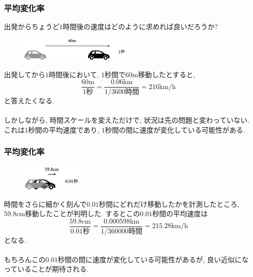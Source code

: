 \documentclass[dvipdfmx,cjk,10.2pt]{beamer}
\theoremstyle{definition}
\begin{document}
\begin{frame}
\frametitle{平均変化率}

出発からちょうど$1$時間後の速度はどのように求めれば良いだろうか? 

\vspace{-2mm}

 \begin{figure}[htbp]
 \begin{center} 
  \includegraphics[width=55mm]{60m.png}
 \end{center}
\end{figure}

\vspace{-2mm}

出発してから$1$時間後において, $1$秒間で$60$m移動したとすると, 
$$
\frac{\text{$60$m}}{\text{$1$秒}}=
\frac{\text{$0.06$km}}{\text{$1/3600$時間}}=216\text{km/h}
$$
と答えたくなる. \\
\ \\

しかしながら, 時間スケールを変えただけで, 状況は先の問題と変わっていない. 
これは$1$秒間の平均速度であり, 
$1$秒間の間に速度が変化している可能性がある. 


\end{frame}






\begin{frame}
\frametitle{平均変化率}

\vspace{-10mm}

 \begin{figure}[htbp]
 \begin{center} 
  \includegraphics[width=30mm]{59cm.png}
 \end{center}
\end{figure}

\vspace{-2mm}

時間をさらに細かく刻んで$0.01$秒間にどれだけ移動したかを計測したところ, $59.8$cm移動したことが判明した. 
するとこの$0.01$秒間の平均速度は
$$
\frac{\text{$59.8$cm}}{\text{$0.01$秒}}=
\frac{\text{$0.000598$km}}{\text{$1/360000$時間}}=215.28\text{km/h}
$$
となる. \\
\ \\

もちろんこの$0.01$秒間の間に速度が変化している可能性があるが, 良い近似になっていることが期待される.  


\end{frame}
\end{document}

